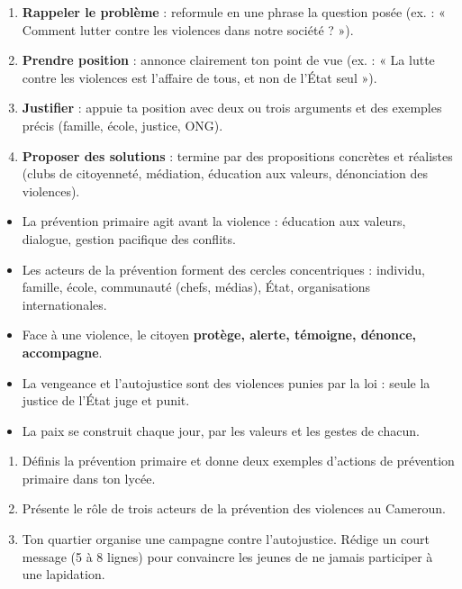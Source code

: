 \documentclass[11pt]{article}
\newcommand{\cle}[1]{{\popxbold\color{popdark}#1}}
\begin{document}
\begin{methode}
\begin{enumerate}
\item \textbf{Rappeler le problème} : reformule en une phrase la question posée (ex. : « Comment lutter contre les violences dans notre société ? »).
\item \textbf{Prendre position} : annonce clairement ton point de vue (ex. : « La lutte contre les violences est l'affaire de tous, et non de l'État seul »).
\item \textbf{Justifier} : appuie ta position avec deux ou trois arguments et des exemples précis (famille, école, justice, ONG).
\item \textbf{Proposer des solutions} : termine par des propositions concrètes et réalistes (clubs de citoyenneté, médiation, éducation aux valeurs, dénonciation des violences).
\end{enumerate}
\end{methode}

\begin{aretenir}
\begin{itemize}
\item La \cle{prévention primaire} agit avant la violence : éducation aux valeurs, dialogue, gestion pacifique des conflits.
\item Les acteurs de la prévention forment des cercles concentriques : individu, famille, école, communauté (chefs, médias), État, organisations internationales.
\item Face à une violence, le citoyen \textbf{protège, alerte, témoigne, dénonce, accompagne}.
\item La vengeance et l'autojustice sont des violences punies par la loi : seule la justice de l'État juge et punit.
\item La paix se construit chaque jour, par les valeurs et les gestes de chacun.
\end{itemize}
\end{aretenir}

\begin{exercice}
\begin{enumerate}
\item Définis la prévention primaire et donne deux exemples d'actions de prévention primaire dans ton lycée.
\item Présente le rôle de trois acteurs de la prévention des violences au Cameroun.
\item Ton quartier organise une campagne contre l'autojustice. Rédige un court message (5 à 8 lignes) pour convaincre les jeunes de ne jamais participer à une lapidation.
\end{enumerate}
\end{exercice}
\end{document}
